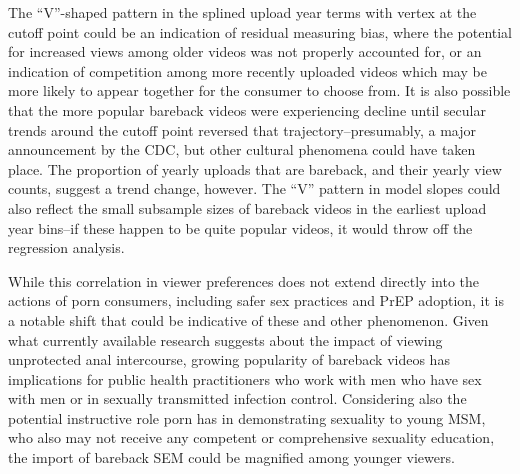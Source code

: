 \documentclass[]{article}
\begin{document}
The ``V''-shaped pattern in the splined upload year terms with vertex at
the cutoff point could be an indication of residual measuring bias,
where the potential for increased views among older videos was not
properly accounted for, or an indication of competition among more
recently uploaded videos which may be more likely to appear together for
the consumer to choose from. It is also possible that the more popular
bareback videos were experiencing decline until secular trends around
the cutoff point reversed that trajectory--presumably, a major
announcement by the CDC, but other cultural phenomena could have taken
place. The proportion of yearly uploads that are bareback, and their
yearly view counts, suggest a trend change, however. The ``V'' pattern
in model slopes could also reflect the small subsample sizes of bareback
videos in the earliest upload year bins--if these happen to be quite
popular videos, it would throw off the regression analysis.

While this correlation in viewer preferences does not extend directly
into the actions of porn consumers, including safer sex practices and
PrEP adoption, it is a notable shift that could be indicative of these
and other phenomenon. Given what currently available research suggests
about the impact of viewing unprotected anal intercourse, growing
popularity of bareback videos has implications for public health
practitioners who work with men who have sex with men or in sexually
transmitted infection control. Considering also the potential
instructive role porn has in demonstrating sexuality to young MSM, who
also may not receive any competent or comprehensive sexuality education,
the import of bareback SEM could be magnified among younger viewers.
\end{document}

